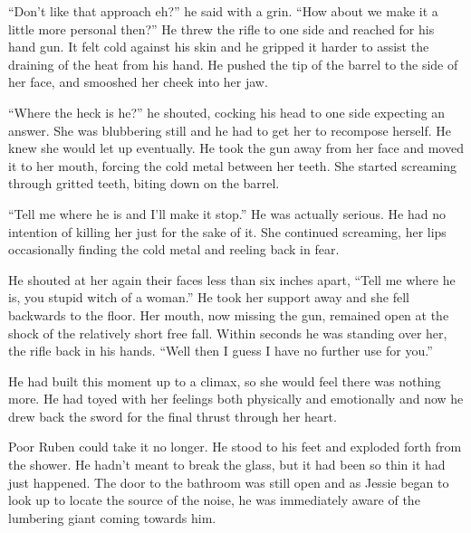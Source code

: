 ``Don't like that approach eh?'' he said with a grin.  ``How about we make it a little more personal then?''  He threw the rifle to one side and reached for his hand gun.  It felt cold against his skin and he gripped it harder to assist the draining of the heat from his hand.  He pushed the tip of the barrel to the side of her face, and smooshed her cheek into her jaw.  

``Where the heck is he?'' he shouted, cocking his head to one side expecting an answer.  She was blubbering still and he had to get her to recompose herself.  He knew she would let up eventually.  He took the gun away from her face and moved it to her mouth, forcing the cold metal between her teeth.  She started screaming through gritted teeth, biting down on the barrel.

``Tell me where he is and I'll make it stop.'' He was actually serious.  He had no intention of killing her just for the sake of it.  She continued screaming, her lips occasionally finding the cold metal and reeling back in fear.

He shouted at her again their faces less than six inches apart, ``Tell me where he is, you stupid witch of a woman.''  He took her support away and she fell backwards to the floor.  Her mouth, now missing the gun, remained open at the shock of the relatively short free fall.  Within seconds he was standing over her, the rifle back in his hands.  ``Well then I guess I have no further use for you.''  

He had built this moment up to a climax, so she would feel there was nothing more.  He had toyed with her feelings both physically and emotionally and now he drew back the sword for the final thrust through her heart.  

Poor Ruben could take it no longer.  He stood to his feet and exploded forth from the shower.  He hadn't meant to break the glass, but it had been so thin it had just happened.  The door to the bathroom was still open and as Jessie began to look up to locate the source of the noise, he was immediately aware of the lumbering giant coming towards him.







